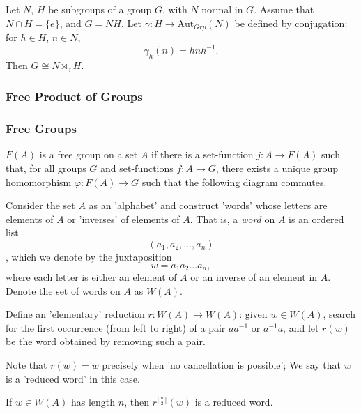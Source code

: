 \begin{proposition}
Let $N$, $H$ be subgroups of a group $G$, with $N$ normal in $G$. Assume that $N \cap H = \{ e \}$, and $G = NH$. Let $\gamma : H \rightarrow \textrm{Aut}_{Grp}(N)$ be defined by conjugation:
for $h \in H$, $n \in N$,
$$\gamma_h(n) = hnh^{-1}.$$
Then $G \cong N \rtimes_{\gamma} H.$
\end{proposition}

\subsubsection{Free Product of Groups}\label{freegroupproduct}

\subsubsection{Free Groups}\label{freegroup}
$F(A)$ is a free group on a set $A$ if there is a set-function $j : A \rightarrow F(A)$ such that, for all groups $G$
and set-functions $f : A \rightarrow G$, there exists a unique group homomorphism $\varphi : F(A) \rightarrow G$ such that
the following diagram commutes.

\begin{figure}[H]
\centering

\end{figure}


Consider the set $A$ as an 'alphabet' and construct 'words' whose letters are elements of $A$ or 'inverses' of elements of $A$.
That is, a \emph{word} on $A$ is an ordered list
$$(a_1,a_2,\dots,a_n)$$,
which we denote by the juxtaposition
$$w = a_1a_2\dots a_n,$$
where each letter is either an element of $A$ or an inverse of an element in $A$. Denote the set of words on $A$ as $W(A)$.

Define an 'elementary' reduction $r : W(A) \rightarrow W(A)$: given $w \in W(A)$, search for the first occurrence (from left
to right) of a pair $aa^{-1}$ or $a^{-1}a$, and let $r(w)$ be the word obtained by removing such a pair.

Note that $r(w) = w$ precisely when 'no cancellation is possible'; We say that $w$ is a 'reduced word' in this case.

\begin{lemma}
If $w \in W(A)$ has length $n$, then $r^{\lfloor \frac{n}{2} \rfloor}(w)$ is a reduced word.
\end{lemma}

